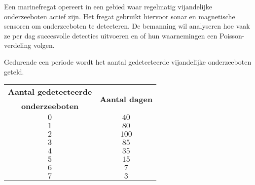 \begin{question}{25}{
    Een marinefregat opereert in een gebied waar regelmatig vijandelijke onderzeeboten actief zijn.
    Het fregat gebruikt hiervoor sonar en magnetische sensoren om onderzeeboten te detecteren.
    De bemanning wil analyseren hoe vaak ze per dag succesvolle detecties uitvoeren en of hun waarnemingen een Poisson-verdeling volgen.

    Gedurende een periode wordt het aantal gedetecteerde vijandelijke onderzeeboten geteld.
    \begin{center}
        \begin{tabular}{cc}
            \toprule
                \textbf{Aantal gedetecteerde} & \multirow{2}{*}{\textbf{Aantal dagen}} \\
                \textbf{onderzeeboten}        & \\
            \midrule
                $0$ & $40$ \\
                $1$ & $80$ \\
                $2$ & $100$ \\
                $3$ & $85$ \\
                $4$ & $35$ \\
                $5$ & $15$ \\
                $6$ & $7$ \\
                $7$ & $3$ \\
            \bottomrule
        \end{tabular}
    \end{center}
}


\end{question}

